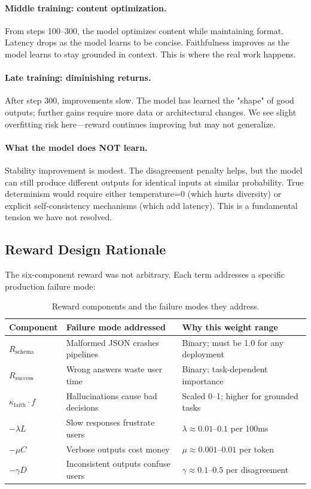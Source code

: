 \documentclass[11pt]{article}
\begin{document}
\paragraph{Middle training: content optimization.}
From steps 100--300, the model optimizes content while maintaining format.
Latency drops as the model learns to be concise.
Faithfulness improves as the model learns to stay grounded in context.
This is where the real work happens.

\paragraph{Late training: diminishing returns.}
After step 300, improvements slow.
The model has learned the "shape" of good outputs; further gains require more data or architectural changes.
We see slight overfitting risk here---reward continues improving but may not generalize.

\paragraph{What the model does NOT learn.}
Stability improvement is modest.
The disagreement penalty helps, but the model can still produce different outputs for identical inputs at similar probability.
True determinism would require either temperature=0 (which hurts diversity) or explicit self-consistency mechanisms (which add latency).
This is a fundamental tension we have not resolved.

\subsection{Reward Design Rationale}

The six-component reward was not arbitrary.
Each term addresses a specific production failure mode:

\begin{table}[t]
\centering
\caption{Reward components and the failure modes they address.}
\label{tab:reward-rationale}
\begin{tabular}{@{}lp{5cm}p{5cm}@{}}
\toprule
\textbf{Component} & \textbf{Failure mode addressed} & \textbf{Why this weight range} \\
\midrule
$R_{\text{schema}}$ & Malformed JSON crashes pipelines & Binary; must be 1.0 for any deployment \\
$R_{\text{success}}$ & Wrong answers waste user time & Binary; task-dependent importance \\
$\kappa_{\text{faith}} \cdot f$ & Hallucinations cause bad decisions & Scaled 0--1; higher for grounded tasks \\
$-\lambda L$ & Slow responses frustrate users & $\lambda \approx 0.01$--$0.1$ per 100ms \\
$-\mu C$ & Verbose outputs cost money & $\mu \approx 0.001$--$0.01$ per token \\
$-\gamma D$ & Inconsistent outputs confuse users & $\gamma \approx 0.1$--$0.5$ per disagreement \\
\bottomrule
\end{tabular}
\end{table}
\end{document}
